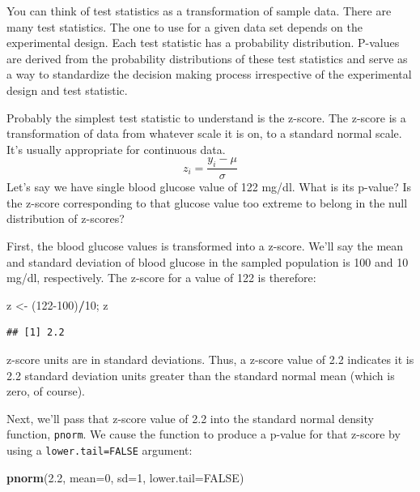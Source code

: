 \documentclass[]{book}
\newenvironment{Shaded}{\begin{snugshade}}{\end{snugshade}}
\newcommand{\DataTypeTok}[1]{\textcolor[rgb]{0.13,0.29,0.53}{#1}}
\newcommand{\DecValTok}[1]{\textcolor[rgb]{0.00,0.00,0.81}{#1}}
\newcommand{\FloatTok}[1]{\textcolor[rgb]{0.00,0.00,0.81}{#1}}
\newcommand{\KeywordTok}[1]{\textcolor[rgb]{0.13,0.29,0.53}{\textbf{#1}}}
\newcommand{\NormalTok}[1]{#1}
\newcommand{\OperatorTok}[1]{\textcolor[rgb]{0.81,0.36,0.00}{\textbf{#1}}}
\newcommand{\OtherTok}[1]{\textcolor[rgb]{0.56,0.35,0.01}{#1}}
\newcommand{\StringTok}[1]{\textcolor[rgb]{0.31,0.60,0.02}{#1}}
\begin{document}
You can think of test statistics as a transformation of sample data. There are many test statistics. The one to use for a given data set depends on the experimental design. Each test statistic has a probability distribution. P-values are derived from the probability distributions of these test statistics and serve as a way to standardize the decision making process irrespective of the experimental design and test statistic.

Probably the simplest test statistic to understand is the z-score. The z-score is a transformation of data from whatever scale it is on, to a standard normal scale. It's usually appropriate for continuous data.
\[z_i=\frac{y_i-\mu}{\sigma}\]
Let's say we have single blood glucose value of 122 mg/dl. What is its p-value? Is the z-score corresponding to that glucose value too extreme to belong in the null distribution of z-scores?

First, the blood glucose values is transformed into a z-score. We'll say the mean and standard deviation of blood glucose in the sampled population is 100 and 10 mg/dl, respectively. The z-score for a value of 122 is therefore:

\begin{Shaded}
\begin{Highlighting}[]
\NormalTok{z <-}\StringTok{ }\NormalTok{(}\DecValTok{122-100}\NormalTok{)}\OperatorTok{/}\DecValTok{10}\NormalTok{; z}
\end{Highlighting}
\end{Shaded}

\begin{verbatim}
## [1] 2.2
\end{verbatim}

z-score units are in standard deviations. Thus, a z-score value of 2.2 indicates it is 2.2 standard deviation units greater than the standard normal mean (which is zero, of course).

Next, we'll pass that z-score value of 2.2 into the standard normal density function, \texttt{pnorm}. We cause the function to produce a p-value for that z-score by using a \texttt{lower.tail=FALSE} argument:

\begin{Shaded}
\begin{Highlighting}[]
\KeywordTok{pnorm}\NormalTok{(}\FloatTok{2.2}\NormalTok{, }\DataTypeTok{mean=}\DecValTok{0}\NormalTok{, }\DataTypeTok{sd=}\DecValTok{1}\NormalTok{, }\DataTypeTok{lower.tail=}\OtherTok{FALSE}\NormalTok{)}
\end{Highlighting}
\end{Shaded}
\end{document}
